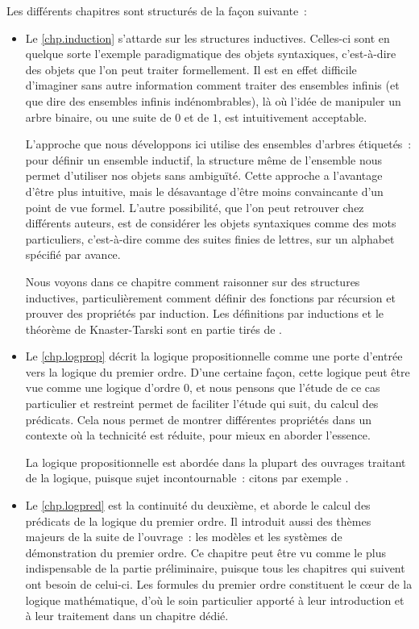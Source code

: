 Les différents chapitres sont structurés de la façon suivante~:
\begin{itemize}
\item Le \cref{chp.induction} s'attarde sur les structures inductives. Celles-ci
  sont en quelque sorte l'exemple paradigmatique des objets syntaxiques,
  c'est-à-dire des objets que l'on peut traiter formellement. Il est en effet
  difficile d'imaginer sans autre information comment traiter des ensembles
  infinis (et que dire des ensembles infinis indénombrables), là où l'idée de
  manipuler un arbre binaire, ou une suite de $0$ et de $1$, est intuitivement
  acceptable.

  L'approche que nous développons ici utilise des ensembles d'arbres étiquetés~:
  pour définir un ensemble inductif, la structure même de l'ensemble nous permet
  d'utiliser nos objets sans ambiguïté. Cette approche a l'avantage d'être plus
  intuitive, mais le désavantage d'être moins convaincante d'un point de vue
  formel. L'autre possibilité, que l'on peut retrouver chez différents auteurs,
  est de considérer les objets syntaxiques comme des mots particuliers,
  c'est-à-dire comme des suites finies de lettres, sur un alphabet spécifié par
  avance.

  Nous voyons dans ce chapitre comment raisonner sur des structures inductives,
  particulièrement comment définir des fonctions par récursion et prouver des
  propriétés par induction. Les définitions par inductions et le théorème de
  Knaster-Tarski sont en partie tirés de
  \cite{Winskel1993}.
  
\item Le \cref{chp.logprop} décrit la logique propositionnelle comme une porte
  d'entrée vers la logique du premier ordre. D'une certaine façon, cette logique
  peut être vue comme une logique d'ordre $0$, et nous pensons que l'étude de ce
  cas particulier et restreint permet de faciliter l'étude qui suit, du calcul
  des prédicats. Cela nous permet de montrer différentes propriétés dans un
  contexte où la technicité est réduite, pour mieux en aborder l'essence.

  La logique propositionnelle est abordée dans la plupart des ouvrages traitant
  de la logique, puisque sujet incontournable~: citons par exemple
  \cite{Cori2003,David2003}.
  
\item Le \cref{chp.logpred} est la continuité du deuxième, et aborde le calcul
  des prédicats de la logique du premier ordre. Il introduit aussi des thèmes
  majeurs de la suite de l'ouvrage~: les modèles et les systèmes de
  démonstration du premier ordre. Ce chapitre peut être vu comme le plus
  indispensable de la partie préliminaire, puisque tous les chapitres qui
  suivent ont besoin de celui-ci. Les formules du premier ordre constituent le
  c\oe ur de la logique mathématique, d'où le soin particulier apporté à leur
  introduction et à leur traitement dans un chapitre dédié.


\end{itemize}
